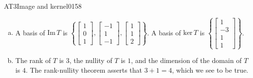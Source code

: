 \begin{exercise}{AT3}{Image and kernel}{0158}
\begin{exerciseAnswer}
\begin{enumerate}[(a)]
 
\item  

 A basis of \(\mathrm{Im}\,T\) is \(\left\{ \left[\begin{array}{c}
1 \\
0 \\
1
\end{array}\right] , \left[\begin{array}{c}
-1 \\
1 \\
-1
\end{array}\right] , \left[\begin{array}{c}
1 \\
1 \\
2
\end{array}\right] \right\}\). A basis of \(\mathrm{ker}\,T\) is \(\left\{ \left[\begin{array}{c}
1 \\
-3 \\
1 \\
1
\end{array}\right] \right\}\). 

 
\item  

 The rank of \(T\) is \(3\), the nullity of \(T\) is \(1\), and the dimension of the domain of \(T\) is \(4\). The rank-nullity theorem asserts that \(3+1=4\), which we see to be true. 

 
\end{enumerate}

     \end{exerciseAnswer}
 \end{exercise}




